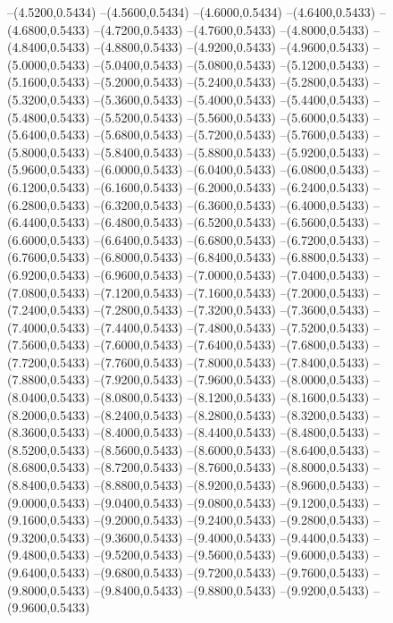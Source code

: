{	--(4.5200,0.5434)
	--(4.5600,0.5434)
	--(4.6000,0.5434)
	--(4.6400,0.5433)
	--(4.6800,0.5433)
	--(4.7200,0.5433)
	--(4.7600,0.5433)
	--(4.8000,0.5433)
	--(4.8400,0.5433)
	--(4.8800,0.5433)
	--(4.9200,0.5433)
	--(4.9600,0.5433)
	--(5.0000,0.5433)
	--(5.0400,0.5433)
	--(5.0800,0.5433)
	--(5.1200,0.5433)
	--(5.1600,0.5433)
	--(5.2000,0.5433)
	--(5.2400,0.5433)
	--(5.2800,0.5433)
	--(5.3200,0.5433)
	--(5.3600,0.5433)
	--(5.4000,0.5433)
	--(5.4400,0.5433)
	--(5.4800,0.5433)
	--(5.5200,0.5433)
	--(5.5600,0.5433)
	--(5.6000,0.5433)
	--(5.6400,0.5433)
	--(5.6800,0.5433)
	--(5.7200,0.5433)
	--(5.7600,0.5433)
	--(5.8000,0.5433)
	--(5.8400,0.5433)
	--(5.8800,0.5433)
	--(5.9200,0.5433)
	--(5.9600,0.5433)
	--(6.0000,0.5433)
	--(6.0400,0.5433)
	--(6.0800,0.5433)
	--(6.1200,0.5433)
	--(6.1600,0.5433)
	--(6.2000,0.5433)
	--(6.2400,0.5433)
	--(6.2800,0.5433)
	--(6.3200,0.5433)
	--(6.3600,0.5433)
	--(6.4000,0.5433)
	--(6.4400,0.5433)
	--(6.4800,0.5433)
	--(6.5200,0.5433)
	--(6.5600,0.5433)
	--(6.6000,0.5433)
	--(6.6400,0.5433)
	--(6.6800,0.5433)
	--(6.7200,0.5433)
	--(6.7600,0.5433)
	--(6.8000,0.5433)
	--(6.8400,0.5433)
	--(6.8800,0.5433)
	--(6.9200,0.5433)
	--(6.9600,0.5433)
	--(7.0000,0.5433)
	--(7.0400,0.5433)
	--(7.0800,0.5433)
	--(7.1200,0.5433)
	--(7.1600,0.5433)
	--(7.2000,0.5433)
	--(7.2400,0.5433)
	--(7.2800,0.5433)
	--(7.3200,0.5433)
	--(7.3600,0.5433)
	--(7.4000,0.5433)
	--(7.4400,0.5433)
	--(7.4800,0.5433)
	--(7.5200,0.5433)
	--(7.5600,0.5433)
	--(7.6000,0.5433)
	--(7.6400,0.5433)
	--(7.6800,0.5433)
	--(7.7200,0.5433)
	--(7.7600,0.5433)
	--(7.8000,0.5433)
	--(7.8400,0.5433)
	--(7.8800,0.5433)
	--(7.9200,0.5433)
	--(7.9600,0.5433)
	--(8.0000,0.5433)
	--(8.0400,0.5433)
	--(8.0800,0.5433)
	--(8.1200,0.5433)
	--(8.1600,0.5433)
	--(8.2000,0.5433)
	--(8.2400,0.5433)
	--(8.2800,0.5433)
	--(8.3200,0.5433)
	--(8.3600,0.5433)
	--(8.4000,0.5433)
	--(8.4400,0.5433)
	--(8.4800,0.5433)
	--(8.5200,0.5433)
	--(8.5600,0.5433)
	--(8.6000,0.5433)
	--(8.6400,0.5433)
	--(8.6800,0.5433)
	--(8.7200,0.5433)
	--(8.7600,0.5433)
	--(8.8000,0.5433)
	--(8.8400,0.5433)
	--(8.8800,0.5433)
	--(8.9200,0.5433)
	--(8.9600,0.5433)
	--(9.0000,0.5433)
	--(9.0400,0.5433)
	--(9.0800,0.5433)
	--(9.1200,0.5433)
	--(9.1600,0.5433)
	--(9.2000,0.5433)
	--(9.2400,0.5433)
	--(9.2800,0.5433)
	--(9.3200,0.5433)
	--(9.3600,0.5433)
	--(9.4000,0.5433)
	--(9.4400,0.5433)
	--(9.4800,0.5433)
	--(9.5200,0.5433)
	--(9.5600,0.5433)
	--(9.6000,0.5433)
	--(9.6400,0.5433)
	--(9.6800,0.5433)
	--(9.7200,0.5433)
	--(9.7600,0.5433)
	--(9.8000,0.5433)
	--(9.8400,0.5433)
	--(9.8800,0.5433)
	--(9.9200,0.5433)
	--(9.9600,0.5433)
}
